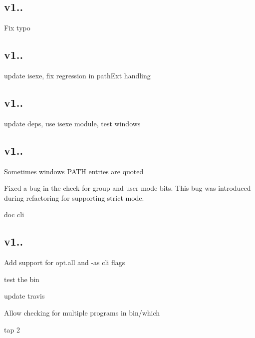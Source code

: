 \subsection*{v1..}


\begin{DoxyItemize}
\item Fix typo
\end{DoxyItemize}

\subsection*{v1..}


\begin{DoxyItemize}
\item update isexe, fix regression in path\+Ext handling
\end{DoxyItemize}

\subsection*{v1..}


\begin{DoxyItemize}
\item update deps, use isexe module, test windows
\end{DoxyItemize}

\subsection*{v1..}


\begin{DoxyItemize}
\item Sometimes windows P\+A\+TH entries are quoted
\item Fixed a bug in the check for group and user mode bits. This bug was introduced during refactoring for supporting strict mode.
\item doc cli
\end{DoxyItemize}

\subsection*{v1..}


\begin{DoxyItemize}
\item Add support for opt.\+all and -\/as cli flags
\item test the bin
\item update travis
\item Allow checking for multiple programs in bin/which
\item tap 2
\end{DoxyItemize}

